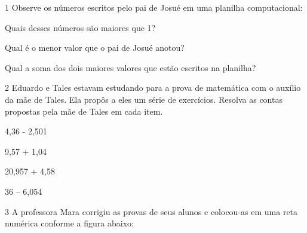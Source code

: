 
\num{1} Observe os números escritos pelo pai de Josué em uma planilha computacional:


\begin{escolha}
\item
  Quais desses números são maiores que 1?


\item
  Qual é o menor valor que o pai de Josué anotou?


\item
  Qual a soma dos dois maiores valores que estão escritos na planilha?

\end{escolha}


\num{2} Eduardo e Tales estavam estudando para a prova de matemática com o
auxílio da mãe de Tales. Ela propôs a eles um série de exercícios.
Resolva as contas propostas pela mãe de Tales em cada item.

\begin{escolha}
\item
  4,36 - 2,501


\item
  9,57 + 1,04


\item
  20,957 + 4,58


\item
  36 -- 6,054

\end{escolha}


\num{3} A professora Mara corrigiu as provas de seus alunos e colocou-as em
uma reta numérica conforme a figura abaixo:

